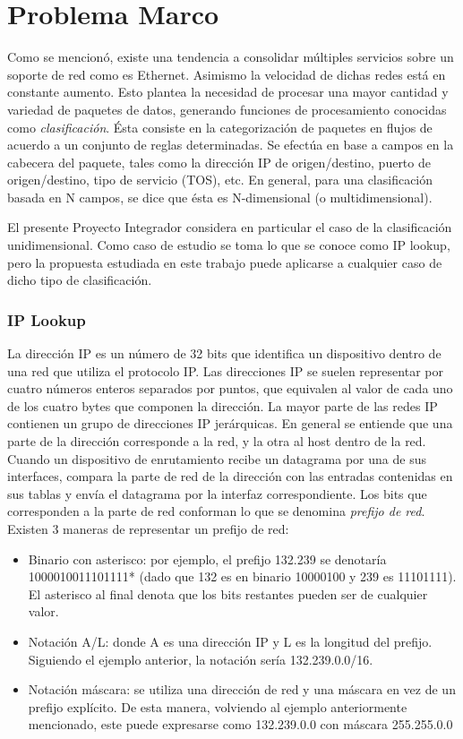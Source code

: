      




\section{Problema Marco}

Como se mencionó, existe una tendencia a consolidar múltiples servicios sobre un soporte de red como es Ethernet. Asimismo la velocidad de dichas redes está en constante aumento. Esto plantea la necesidad de procesar una mayor cantidad y variedad de paquetes de datos, generando funciones de procesamiento conocidas como \textit{clasificación}. Ésta consiste en la categorización de paquetes en flujos de acuerdo a un conjunto de reglas determinadas. Se efectúa en base a campos en la cabecera del paquete, tales como la dirección IP de origen/destino, puerto de origen/destino, tipo de servicio (TOS), etc. En general, para una clasificación basada en N campos, se dice que ésta es N-dimensional (o multidimensional).

El presente Proyecto Integrador considera en particular el caso de la clasificación unidimensional. Como caso de estudio se toma lo que se conoce como IP lookup, pero la propuesta estudiada en este trabajo puede aplicarse a cualquier caso de dicho tipo de clasificación.

\subsubsection{IP Lookup}

La dirección IP es un número de 32 bits que identifica un dispositivo dentro de una red que utiliza el protocolo IP. Las direcciones IP se suelen representar por cuatro números enteros separados por puntos, que equivalen al valor de cada uno de los cuatro bytes que componen la dirección.
La mayor parte de las redes IP contienen un grupo de direcciones IP jerárquicas. En general se entiende que una parte de la dirección corresponde a la red, y la otra al host dentro de la red. Cuando un dispositivo de enrutamiento recibe un datagrama por una de sus interfaces, compara la parte de red de la dirección con las entradas contenidas en sus tablas y envía el datagrama por la interfaz correspondiente.
Los bits que corresponden a la parte de red conforman lo que se denomina \textit{prefijo de red}.
Existen 3 maneras de representar un prefijo de red:

\begin{itemize}
	\item Binario con asterisco: por ejemplo, el prefijo 132.239 se denotaría 1000010011101111* (dado que 132 es en binario 10000100 y 239 es 11101111). El asterisco al final denota que los bits restantes pueden ser de cualquier valor.
	\item Notación A/L: donde A es una dirección IP y L es la longitud del prefijo. Siguiendo el ejemplo anterior, la notación sería 132.239.0.0/16.
	\item Notación máscara: se utiliza una dirección de red y una máscara en vez de un prefijo explícito. De esta manera, volviendo al ejemplo anteriormente mencionado, este puede expresarse como 132.239.0.0 con máscara 255.255.0.0
\end{itemize}

